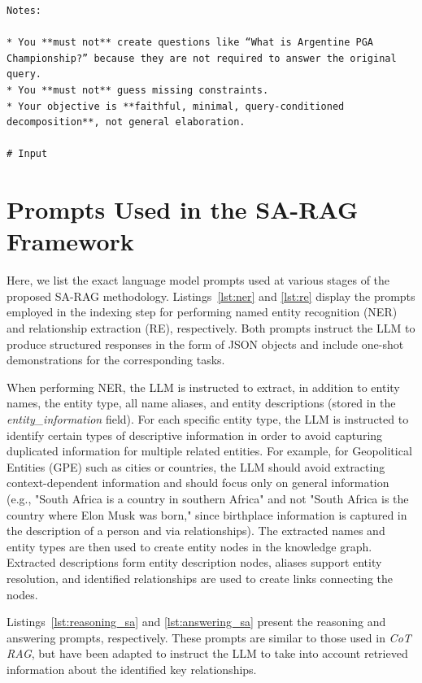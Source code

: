 \documentclass{article}
\begin{document}
\begin{lstlisting}[style=baselinestyle, caption={Question decomposition prompt}, label={lst:decompose}]
Notes:

* You **must not** create questions like “What is Argentine PGA Championship?” because they are not required to answer the original query.
* You **must not** guess missing constraints.
* Your objective is **faithful, minimal, query-conditioned decomposition**, not general elaboration.

# Input

\end{lstlisting}

\section{Prompts Used in the SA-RAG Framework}

Here, we list the exact language model prompts used at various stages of the proposed SA-RAG methodology. Listings~\ref{lst:ner} and \ref{lst:re} display the prompts employed in the indexing step for performing named entity recognition (NER) and relationship extraction (RE), respectively. Both prompts instruct the LLM to produce structured responses in the form of JSON objects and include one-shot demonstrations for the corresponding tasks.

When performing NER, the LLM is instructed to extract, in addition to entity names, the entity type, all name aliases, and entity descriptions (stored in the \textit{entity\_information} field). For each specific entity type, the LLM is instructed to identify certain types of descriptive information in order to avoid capturing duplicated information for multiple related entities. For example, for Geopolitical Entities (GPE) such as cities or countries, the LLM should avoid extracting context-dependent information and should focus only on general information (e.g., "South Africa is a country in southern Africa" and not "South Africa is the country where Elon Musk was born," since birthplace information is captured in the description of a person and via relationships). The extracted names and entity types are then used to create entity nodes in the knowledge graph. Extracted descriptions form entity description nodes, aliases support entity resolution, and identified relationships are used to create links connecting the nodes.

Listings~\ref{lst:reasoning_sa} and \ref{lst:answering_sa} present the reasoning and answering prompts, respectively. These prompts are similar to those used in \emph{CoT RAG}, but have been adapted to instruct the LLM to take into account retrieved information about the identified key relationships.
\end{document}
